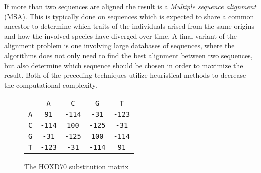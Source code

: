 \documentclass[thesis.tex]{subfiles}
\begin{document}
\par\noindent
If more than two sequences are aligned the result is a \textit{Multiple sequence alignment} (MSA). This is typically done on sequences which is expected to share a common ancestor to determine which traits of the individuals arised from the same origins and how the involved species have diverged over time. A final variant of the alignment problem is one involving large databases of sequences, where the algorithms does not only need to find the best alignment between two sequences, but also determine which sequence should be chosen in order to maximize the result. Both of the preceding techniques utilize heuristical methods to decrease the computational complexity.
\begin{wrapfigure}{R}{0.80\linewidth}
  \begin{mdframed}
    \begin{center}
      \begin{tabularx}{\linewidth}{ccccc}
          &\texttt{A}&\texttt{C}&\texttt{G}&\texttt{T}\\ \cline{2-5}
        \texttt{A}&\multicolumn{1}{|c|}{\texttt{91}}&\texttt{-114}&\multicolumn{1}{|c|}{\texttt{-31}}&\multicolumn{1}{c|}{\texttt{-123}}\\ \cline{2-5}
        \texttt{C}&\multicolumn{1}{|c|}{\texttt{-114}}&\texttt{100}&\multicolumn{1}{|c|}{\texttt{-125}}&\multicolumn{1}{c|}{\texttt{-31}}\\ \cline{2-5}
        \texttt{G}&\multicolumn{1}{|c|}{\texttt{-31}}&\texttt{-125}&\multicolumn{1}{|c|}{\texttt{100}}&\multicolumn{1}{c|}{\texttt{-114}}\\ \cline{2-5}
        \texttt{T}&\multicolumn{1}{|c|}{\texttt{-123}}&\texttt{-31}&\multicolumn{1}{|c|}{\texttt{-114}}&\multicolumn{1}{c|}{\texttt{91}}\\ \cline{2-5}
      \end{tabularx}
    \end{center}
  \end{mdframed}
  \caption{The HOXD70 substitution matrix}
  \label{fig:substitution_matrix}
\end{wrapfigure}
\end{document}
